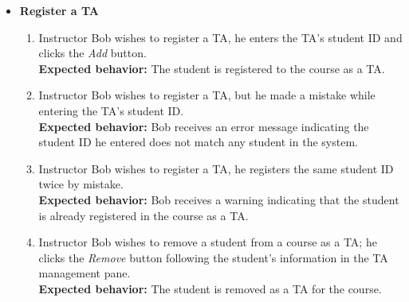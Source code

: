 \begin{itemize}
    \item \textbf{Register a TA} \begin{enumerate}
        \item Instructor Bob wishes to register a TA, he enters the TA's
            student ID and clicks the \emph{Add} button. \\
        {\bf Expected behavior:} The student is registered to the course as a
            TA.

        \item Instructor Bob wishes to register a TA, but he made a mistake while
            entering the TA's student ID. \\
        {\bf Expected behavior:} Bob receives an error message indicating the
            student ID he entered does not match any student in the system.

        \item Instructor Bob wishes to register a TA, he registers the same
            student ID twice by mistake. \\
        {\bf Expected behavior:} Bob receives a warning indicating that the
            student is already registered in the course as a TA.

        \item Instructor Bob wishes to remove a student from a course as a TA;
            he clicks the \emph{Remove} button following the student's information
            in the TA management pane. \\
        {\bf Expected behavior:} The student is removed as a TA for the course.
    \end{enumerate}
\end{itemize}

